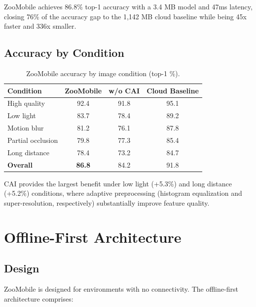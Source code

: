 \documentclass[11pt,a4paper]{article}
\begin{document}
ZooMobile achieves 86.8\% top-1 accuracy with a 3.4 MB model and 47ms latency, closing 76\% of the accuracy gap to the 1,142 MB cloud baseline while being 45x faster and 336x smaller.

\subsection{Accuracy by Condition}

\begin{table}[H]
\centering
\caption{ZooMobile accuracy by image condition (top-1 \%).}
\label{tab:condition_accuracy}
\begin{tabular}{@{}lccc@{}}
\toprule
\textbf{Condition} & \textbf{ZooMobile} & \textbf{w/o CAI} & \textbf{Cloud Baseline} \\
\midrule
High quality & 92.4 & 91.8 & 95.1 \\
Low light & 83.7 & 78.4 & 89.2 \\
Motion blur & 81.2 & 76.1 & 87.8 \\
Partial occlusion & 79.8 & 77.3 & 85.4 \\
Long distance & 78.4 & 73.2 & 84.7 \\
\midrule
\textbf{Overall} & \textbf{86.8} & 84.2 & 91.8 \\
\bottomrule
\end{tabular}
\end{table}

CAI provides the largest benefit under low light (+5.3\%) and long distance (+5.2\%) conditions, where adaptive preprocessing (histogram equalization and super-resolution, respectively) substantially improve feature quality.

\section{Offline-First Architecture}
\label{sec:offline}

\subsection{Design}

ZooMobile is designed for environments with no connectivity.
The offline-first architecture comprises:
\end{document}
